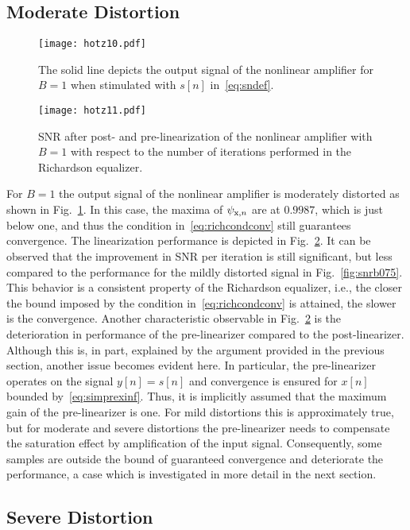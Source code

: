 \documentclass[10pt,twocolumn,twoside]{IEEEtran}
\begin{document}
\subsection{Moderate Distortion}
	\label{results:moderate}

\begin{figure}[!t]\centering \texttt{[image: hotz10.pdf]}\caption{The solid line depicts the output signal of the nonlinear
	amplifier for $B=1$ when stimulated with $s[n]$ in~\eqref{eq:sndef}.}\label{fig:inoutcmpb1}\end{figure}\begin{figure}[!t]\centering \texttt{[image: hotz11.pdf]}\caption{SNR after post- and pre-linearization of the nonlinear amplifier with $B=1$
	with respect to the number of iterations performed in the Richardson equalizer.}\label{fig:snrb1}\end{figure}


For $B=1$ the output signal of the nonlinear amplifier is moderately
distorted as shown in Fig.~\ref{fig:inoutcmpb1}. In this case, the maxima
of $\psi_{\mathrm{x},n}$ are at $0.9987$, which is just below one, and thus the
condition in~\eqref{eq:richcondconv} still guarantees convergence.
The linearization performance is depicted in Fig.~\ref{fig:snrb1}.
It can be observed that the improvement in SNR per iteration is still significant, but less compared to
the performance for the mildly distorted signal in Fig.~\ref{fig:snrb075}. This
behavior is a consistent property of the Richardson equalizer, i.e., the
closer the bound imposed by the condition in~\eqref{eq:richcondconv}
is attained, the slower is the convergence.
Another characteristic observable in Fig.~\ref{fig:snrb1} is the deterioration in performance of
the pre-linearizer compared to the post-linearizer. Although this is, in part, explained by the
argument provided in the previous section, another issue becomes
evident here. In particular, the pre-linearizer operates on the signal $y[n]=s[n]$
and convergence is ensured for $x[n]$ bounded by~\eqref{eq:simprexinf}.
Thus, it is implicitly assumed that the maximum gain of the pre-linearizer is
one. For mild distortions this is approximately true, but for moderate and severe distortions
the pre-linearizer needs to compensate the saturation effect by amplification of the
input signal. Consequently, some samples are outside the bound of guaranteed convergence
and deteriorate the performance, a case which is investigated in more detail in the next section.

\subsection{Severe Distortion}
\end{document}
